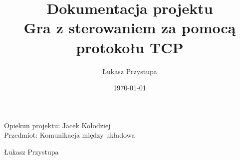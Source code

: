 \documentclass[12pt]{article}
\title{Dokumentacja projektu\\Gra z sterowaniem za pomocą protokołu TCP}
\author{Łukasz Przystupa}
\date{\today}
\numberwithin{equation}{section}
\begin{document}
    \begin{titlepage}
        \maketitle
        \thispagestyle{empty}
        \begin{center}
            Opiekun projektu: Jacek Kołodziej\\
            Przedmiot: Komunikacja między układowa
        \end{center}
    \end{titlepage}

    
    
    
    
    
    \vfill
    \begin{flushright}
        Łukasz Przystupa
    \end{flushright}
\end{document}
